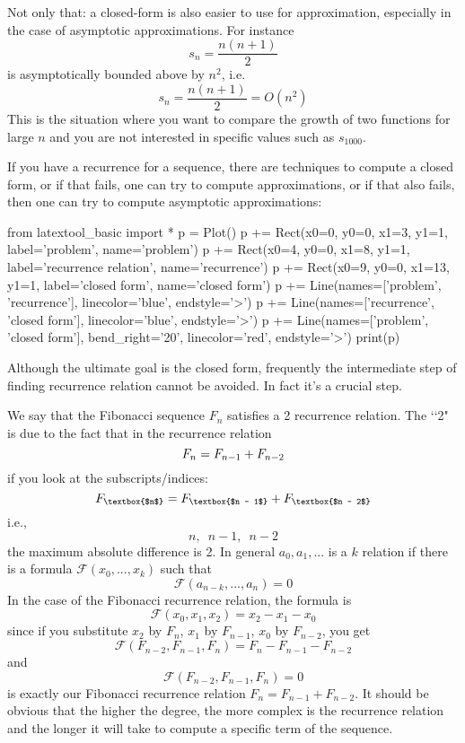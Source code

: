 Not only that:
a closed-form is also easier to use for approximation,
especially in the case of asymptotic approximations.
For instance
\[
s_n = \frac{n(n+1)}{2}
\]
is asymptotically bounded above by $n^2$, i.e.
\[
s_n = \frac{n(n+1)}{2} = O(n^2)
\]
This is the situation where you want to compare the growth of two
functions for large $n$ and you are not interested in 
specific values such as $s_{1000}$.

If you have a recurrence for a sequence, there are techniques to
compute a closed form, or if that fails, one can try to
compute approximations, or if that also fails, then one can try to
compute asymptotic approximations:

\begin{python}
from latextool_basic import *
p = Plot()
p += Rect(x0=0, y0=0, x1=3, y1=1, label='problem', name='problem')
p += Rect(x0=4, y0=0, x1=8, y1=1, label='recurrence relation', name='recurrence')
p += Rect(x0=9, y0=0, x1=13, y1=1, label='closed form', name='closed form')
p += Line(names=['problem', 'recurrence'], linecolor='blue', endstyle='>')
p += Line(names=['recurrence', 'closed form'], linecolor='blue', endstyle='>')
p += Line(names=['problem', 'closed form'], bend_right='20', linecolor='red', endstyle='>')
print(p)
\end{python}

Although the ultimate goal is the closed form, frequently the
intermediate step of finding recurrence relation cannot be avoided.
In fact it's a crucial step.

We say that the Fibonacci sequence
$F_n$ satisfies a  2 recurrence relation.
The \lq\lq 2" is due to the fact that in the recurrence relation
\[
F_n = F_{n-1} + F_{n-2} \\
\]
if you look at the subscripts/indices:
\[
F_{\text{\textbox{$n$}}} = F_{\text{\textbox{$n - 1$}}} + F_{\text{\textbox{$n - 2$}}} 
\]
i.e.,
\[
n, \,\,\, n-1, \,\,\, n-2
\]
the maximum absolute difference is 2.
In general $a_0, a_1, ...$ is a  $k$ relation if there is a
formula ${\mathcal F}(x_0, ..., x_{k})$ such that
\[
{\mathcal F}(a_{n-k}, ..., a_{n}) = 0
\]
In the case of the Fibonacci recurrence relation,
the formula is
\[
  {\mathcal F}(x_0, x_1, x_2) = x_2 - x_1 - x_0
  \]
since if you
substitute
$x_2$ by $F_n$, 
$x_1$ by $F_{n-1}$, 
$x_0$ by $F_{n-2}$,
you get
\[
  {\mathcal F}(F_{n-2}, F_{n-1}, F_{n}) = F_n - F_{n-1} - F_{n-2}
\]
and
\[
  {\mathcal F}(F_{n-2}, F_{n-1}, F_{n}) = 0
  \]
is exactly our Fibonacci recurrence relation
$F_n = F_{n-1} + F_{n-2}$.
It should be obvious that the higher the degree, the more complex
is the recurrence relation and the longer it will take
to compute a specific term of the sequence.


